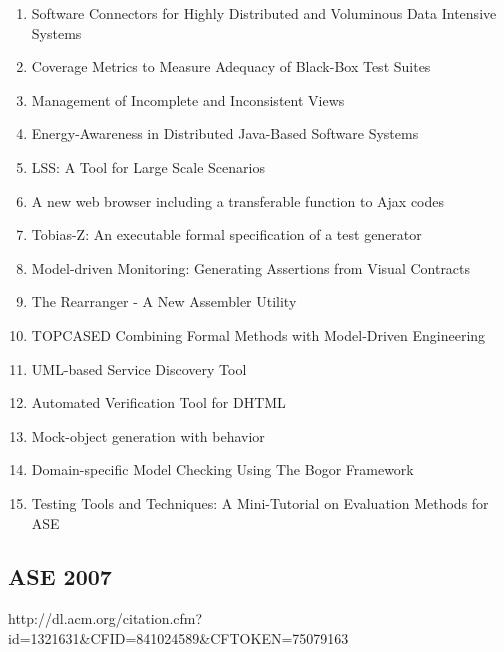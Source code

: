 \begin{enumerate}[itemsep=-1ex]
  \item Software Connectors for Highly Distributed and Voluminous Data Intensive Systems
  \item Coverage Metrics to Measure Adequacy of Black-Box Test Suites
  \item Management of Incomplete and Inconsistent Views
  \item Energy-Awareness in Distributed Java-Based Software Systems
  \item LSS: A Tool for Large Scale Scenarios
  \item A new web browser including a transferable function to Ajax codes
  \item Tobias-Z: An executable formal specification of a test generator
  \item Model-driven Monitoring: Generating Assertions from Visual Contracts
  \item The Rearranger - A New Assembler Utility
  \item TOPCASED Combining Formal Methods with Model-Driven Engineering
  \item UML-based Service Discovery Tool
  \item Automated Verification Tool for DHTML
  \item Mock-object generation with behavior
  \item Domain-specific Model Checking Using The Bogor Framework
  \item Testing Tools and Techniques: A Mini-Tutorial on Evaluation Methods for ASE
\end{enumerate}

\subsection{ASE 2007}

http://dl.acm.org/citation.cfm?id=1321631\&CFID=841024589\&CFTOKEN=75079163

